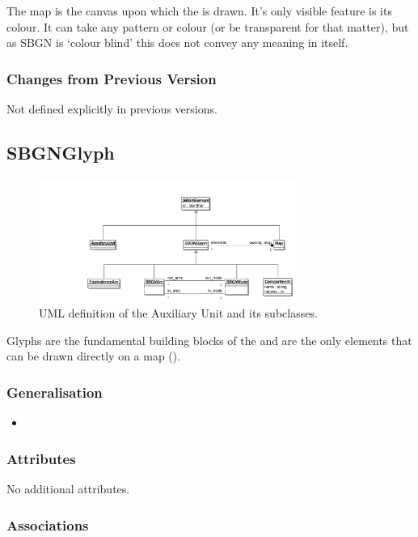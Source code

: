 The map is the canvas upon which the \PDl is drawn. It's only visible
feature is its colour. It can take any pattern or colour (or be
transparent for that matter), but as SBGN is `colour blind' this does
not convey any meaning in itself.

\subsubsection{Changes from Previous Version}

Not defined explicitly in previous versions.

\subsection{SBGNGlyph}
\label{defn:SBGNGlyph}

\begin{figure}[htb]
  \centering
  \includegraphics[width=0.75\textwidth]{images/glyphauxuml}
\caption{UML definition of the Auxiliary Unit and its subclasses.}
  \label{fig:glyphauxuml}
\end{figure}

 Glyphs are the fundamental building blocks of the \PDl and are the
only elements that can be drawn directly on a map ().

\subsubsection{Generalisation}

\begin{itemize}
\item {}
\end{itemize}

\subsubsection{Attributes}

No additional attributes.

\subsubsection{Associations}

